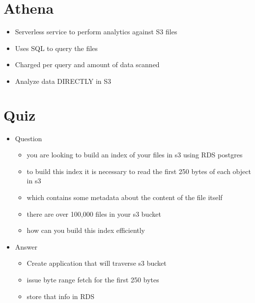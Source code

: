 \documentclass[]{scrartcl}
\begin{document}
\section{Athena}
\begin{itemize}
	\item Serverless service to perform analytics against S3 files
	\item Uses SQL to query the files
	\item Charged per query and amount of data scanned
	\item Analyze data DIRECTLY in S3
\end{itemize}

\section{Quiz}
\begin{itemize}
	\item Question
	\begin{itemize}
		\item you are looking to build an index of your files in s3 using RDS postgres
		\item to build this index it is necessary to read the first 250 bytes of each object in s3
		\item which contains some metadata about the content of the file itself
		\item there are over 100,000 files in your s3 bucket
		\item how can you build this index efficiently
	\end{itemize}
	\item Answer
	\begin{itemize}
		\item Create application that will traverse s3 bucket
		\item issue byte range fetch for the first 250 bytes
		\item store that info in RDS
	\end{itemize}
\end{itemize}
\end{document}
